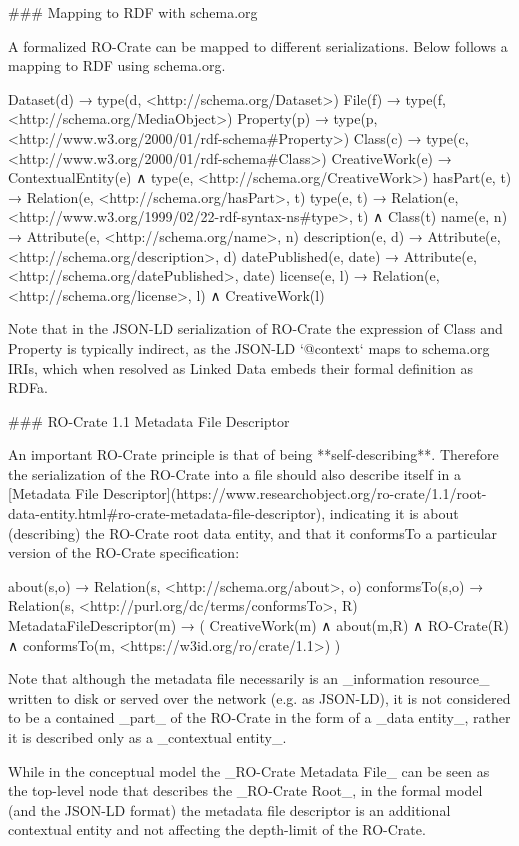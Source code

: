 ### Mapping to RDF with schema.org

A formalized RO-Crate can be mapped to different serializations. Below follows a mapping to RDF using schema.org.

    Dataset(d) →  type(d, <http://schema.org/Dataset>)
    File(f) →  type(f, <http://schema.org/MediaObject>)
    Property(p) →  type(p, <http://www.w3.org/2000/01/rdf-schema#Property>)
    Class(c) →  type(c, <http://www.w3.org/2000/01/rdf-schema#Class>)
    CreativeWork(e) →  ContextualEntity(e) ∧ type(e, <http://schema.org/CreativeWork>)
    hasPart(e, t) →  Relation(e, <http://schema.org/hasPart>, t)
    type(e, t) →  Relation(e, <http://www.w3.org/1999/02/22-rdf-syntax-ns#type>, t) ∧ Class(t)
    name(e, n) →  Attribute(e, <http://schema.org/name>, n)
    description(e, d) →  Attribute(e, <http://schema.org/description>, d)
    datePublished(e, date) →  Attribute(e, <http://schema.org/datePublished>, date)
    license(e, l) →  Relation(e, <http://schema.org/license>, l) ∧ CreativeWork(l)


Note that in the JSON-LD serialization of RO-Crate the expression of Class and Property is typically indirect, as the JSON-LD `@context` maps to schema.org IRIs, which when resolved as Linked Data embeds their formal definition as RDFa. 


### RO-Crate 1.1 Metadata File Descriptor

An important RO-Crate principle is that of being **self-describing**. Therefore the serialization of the RO-Crate into a file should also describe itself in a [Metadata File Descriptor](https://www.researchobject.org/ro-crate/1.1/root-data-entity.html#ro-crate-metadata-file-descriptor), indicating it is about (describing) the RO-Crate root data entity, and that it conformsTo a particular version of the RO-Crate specification:

    about(s,o) →  Relation(s, <http://schema.org/about>, o)
    conformsTo(s,o) →  Relation(s, <http://purl.org/dc/terms/conformsTo>, R)
    MetadataFileDescriptor(m) →  ( CreativeWork(m) ∧ about(m,R) ∧ RO-Crate(R) ∧ 
        conformsTo(m, <https://w3id.org/ro/crate/1.1>) )


Note that although the metadata file necessarily is an _information resource_ written to disk or served over the network (e.g. as JSON-LD), it is not considered to be a contained _part_ of the RO-Crate in the form of a _data entity_, rather it is described only as a _contextual entity_.

While in the conceptual model the _RO-Crate Metadata File_ can be seen as the top-level node that describes the _RO-Crate Root_, in the formal model (and the JSON-LD format) the metadata file descriptor is an additional contextual entity and not affecting the depth-limit of the RO-Crate.


